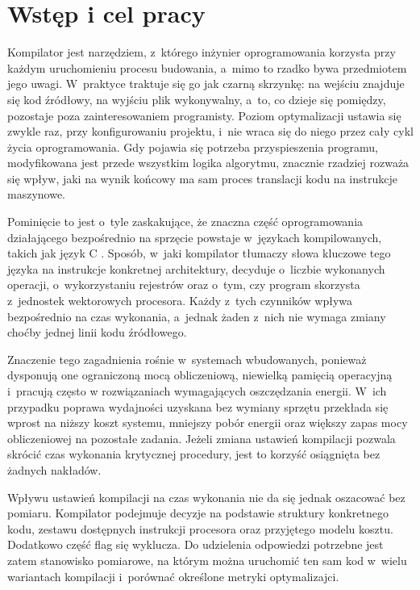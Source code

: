 \chapter{Wstęp i cel pracy}

Kompilator jest narzędziem, z~którego inżynier oprogramowania korzysta przy
każdym uruchomieniu procesu budowania, a~mimo to rzadko bywa przedmiotem jego
uwagi. W~praktyce traktuje się go jak czarną skrzynkę: na wejściu znajduje się
kod źródłowy, na wyjściu plik wykonywalny, a~to, co dzieje się pomiędzy,
pozostaje poza zainteresowaniem programisty. Poziom optymalizacji ustawia się
zwykle raz, przy konfigurowaniu projektu, i~nie wraca się do niego przez cały
cykl życia oprogramowania. Gdy pojawia się potrzeba przyspieszenia programu,
modyfikowana jest przede wszystkim logika algorytmu, znacznie rzadziej rozważa się
wpływ, jaki na wynik końcowy ma sam proces translacji kodu na instrukcje maszynowe.

Pominięcie to jest o~tyle zaskakujące, że znaczna część oprogramowania
działającego bezpośrednio na sprzęcie powstaje w~językach kompilowanych, takich jak język C
\cite{Tanenbaum}.
Sposób, w~jaki kompilator tłumaczy słowa kluczowe tego języka na instrukcje
konkretnej architektury, decyduje o~liczbie wykonanych operacji, o~wykorzystaniu
rejestrów oraz o~tym, czy program skorzysta z~jednostek wektorowych procesora.
Każdy z~tych czynników wpływa bezpośrednio na czas wykonania, a~jednak żaden
z~nich nie wymaga zmiany choćby jednej linii kodu źródłowego.

Znaczenie tego zagadnienia rośnie w~systemach wbudowanych, ponieważ dysponują one 
 ograniczoną mocą obliczeniową, niewielką pamięcią operacyjną
i~pracują często w rozwiązaniach wymagających oszczędzania energii. W~ich przypadku
poprawa wydajności uzyskana bez wymiany sprzętu przekłada się wprost na niższy
koszt systemu, mniejszy pobór energii oraz większy zapas mocy obliczeniowej
na pozostałe zadania. Jeżeli zmiana ustawień kompilacji pozwala skrócić
czas wykonania krytycznej procedury, jest to korzyść osiągnięta bez żadnych
nakładów.

Wpływu ustawień kompilacji na czas wykonania nie da się jednak oszacować bez
pomiaru. Kompilator podejmuje decyzje na podstawie struktury konkretnego kodu,
zestawu dostępnych instrukcji procesora oraz przyjętego modelu kosztu. Dodatkowo część flag się wyklucza.
Do udzielenia odpowiedzi potrzebne jest
zatem stanowisko pomiarowe, na którym można uruchomić ten sam kod w~wielu
wariantach kompilacji i~porównać określone metryki optymalizajci.


